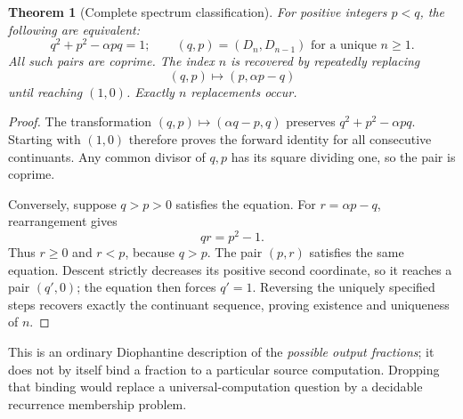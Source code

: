 \documentclass[11pt,letterpaper]{article}
\newtheorem{theorem}{Theorem}[section]
\theoremstyle{definition}
\theoremstyle{remark}
\begin{document}
\begin{theorem}[Complete spectrum classification]\label{ste:cg:thm:pell}
For positive integers $p<q$, the following are equivalent:
\begin{equation}\label{ste:cg:eq:pell}
 q^2+p^2-\alpha pq=1;
 \qquad
 (q,p)=(D_n,D_{n-1})\text{ for a unique }n\ge1.
\end{equation}
All such pairs are coprime. The index $n$ is recovered by repeatedly
replacing
\begin{equation}\label{ste:cg:eq:descent}
 (q,p)\longmapsto(p,\alpha p-q)
\end{equation}
until reaching $(1,0)$. Exactly $n$ replacements occur.
\end{theorem}
\begin{proof}
The transformation $(q,p)\mapsto(\alpha q-p,q)$ preserves
$q^2+p^2-\alpha pq$. Starting with $(1,0)$ therefore proves the forward
identity for all consecutive continuants. Any common divisor of $q,p$
has its square dividing one, so the pair is coprime.

Conversely, suppose $q>p>0$ satisfies the equation. For
$r=\alpha p-q$, rearrangement gives
\begin{equation}\label{ste:cg:eq:descentbound}
 qr=p^2-1.
\end{equation}
Thus $r\ge0$ and $r<p$, because $q>p$. The pair $(p,r)$ satisfies the
same equation. Descent strictly decreases its positive second coordinate,
so it reaches a pair $(q',0)$; the equation then forces $q'=1$.
Reversing the uniquely specified steps recovers exactly the continuant
sequence, proving existence and uniqueness of $n$.
\end{proof}

This is an ordinary Diophantine description of the \emph{possible output
fractions}; it does not by itself bind a fraction to a particular source
computation. Dropping that binding would replace a universal-computation
question by a decidable recurrence membership problem.
\end{document}
